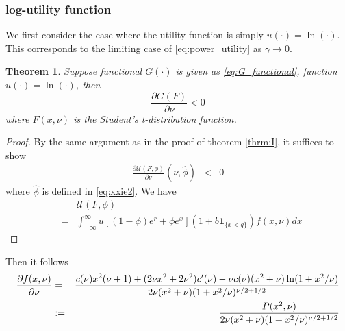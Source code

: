 \documentclass{article}
\newcommand{\pd}[2]{
  \frac{\partial #1}{\partial #2}
}
\newcommand{\1}[1]{
  \mathbf{1}_{\{#1\}}
}
\newtheorem{theorem}{Theorem}
\begin{document}
\subsubsection{log-utility function}
We first consider the case where the utility function is simply
$u(\cdot) = \ln(\cdot)$. This corresponds to the limiting case of
\eqref{eq:power_utility} as $\gamma \to 0$.
\begin{theorem}
  Suppose functional $G(\cdot)$ is given as \eqref{eq:G_functional},
  function $u(\cdot) = \ln(\cdot)$, then
  \[
  \pd{G(F)}{\nu} < 0
  \]
  where $F(x, \nu)$ is the Student's t-distribution function.
\end{theorem}
\begin{proof}
  By the same argument as in the proof of theorem \ref{thrm:I}, it
  suffices to show
  \begin{eqnarray*}
    \pd{\mathcal U(F, \phi)}{\nu}(\nu, \hat\phi) &<& 0
  \end{eqnarray*}
  where $\hat\phi$ is defined in \eqref{eq:xxie2}. We have
  \begin{eqnarray*}
    && \mathcal U(F, \phi) \\
    &=&
    \int_{-\infty}^\infty
    u[(1 - \phi) e^r + \phi e^x] (1 + b \1{x < q}) f(x, \nu) dx
  \end{eqnarray*}

\end{proof}

Then it follows
\begin{eqnarray}
\pd{f(x, \nu)}{\nu} &=& {
  c(\nu) x^2 (\nu + 1) + (2 \nu x^2 + 2 \nu^2) c'(\nu)
  -
  \nu c(\nu) (x^2 + \nu) \ln(1 + x^2/\nu)
  \over
  2 \nu (x^2 + \nu) (1 + x^2 / \nu)^{\nu/2 + 1/2}
  } \nonumber \\
  &:=& {
    P(x^2, \nu)
    \over
    2 \nu (x^2 + \nu) (1 + x^2 / \nu)^{\nu/2 + 1/2}
  }
  \label{eq:xxie4.1}
\end{eqnarray}
\end{document}
